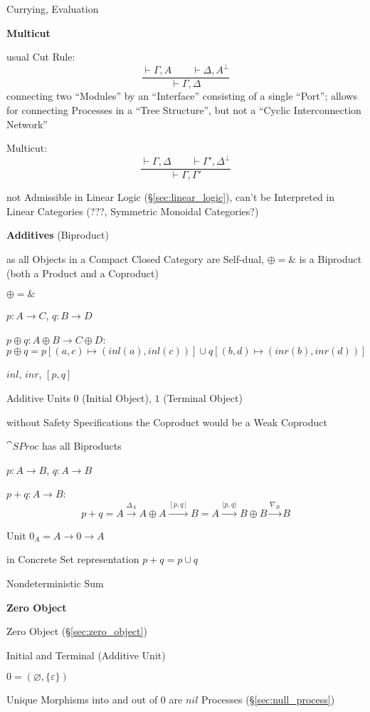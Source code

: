 Currying, Evaluation


\textbf{Multicut}

usual Cut Rule:
\[
  \frac{\vdash\Gamma,A \quad\quad \vdash\Delta,A^\bot}
  {\vdash\Gamma,\Delta}
\]
connecting two ``Modules'' by an ``Interface'' consisting of a single
``Port''; allows for connecting Processes in a ``Tree Structure'', but
not a ``Cyclic Interconnection Network''

Multicut:
\[
  \frac{\vdash\Gamma,\Delta \quad\quad \vdash\Gamma',\Delta^\bot}
  {\vdash\Gamma,\Gamma'}
\]

not Admissible in Linear Logic (\S\ref{sec:linear_logic}), can't be
Interpreted in Linear Categories (???, Symmetric Monoidal Categories?)


\textbf{Additives} (Biproduct)

as all Objects in a Compact Closed Category are Self-dual, $\oplus =
\&$ is a Biproduct (both a Product and a Coproduct)

$\oplus = \&$

$p : A \rightarrow C$, $q : B \rightarrow D$

$p \oplus q : A \oplus B \rightarrow C \oplus D$:
\[
  p \oplus q = p[(a,c) \mapsto (inl(a),inl(c))]
    \cup q[(b,d) \mapsto (inr(b),inr(d))]
\]

$inl$, $inr$, $[p,q]$ %

Additive Units $0$ (Initial Object), $1$ (Terminal Object)

without Safety Specifications the Coproduct would be a Weak Coproduct

$\cat{SProc}$ has all Biproducts

$p : A \rightarrow B$, $q : A \rightarrow B$

$p + q : A \rightarrow B$:
\[
  p + q = A \xrightarrow{\Delta_A} A \oplus A \xrightarrow{[p,q]} B
        = A \xrightarrow{\langle p,q \rangle} B
          \oplus B \xrightarrow{\nabla_B} B
\]

Unit $0_A = A \rightarrow 0 \rightarrow A$

in Concrete Set representation $p + q = p \cup q$

Nondeterministic Sum


\textbf{Zero Object}

Zero Object (\S\ref{sec:zero_object})

Initial and Terminal (Additive Unit)

$0 = (\varnothing, \{\varepsilon\})$

Unique Morphisms into and out of $0$ are $nil$ Processes
(\S\ref{sec:null_process})


